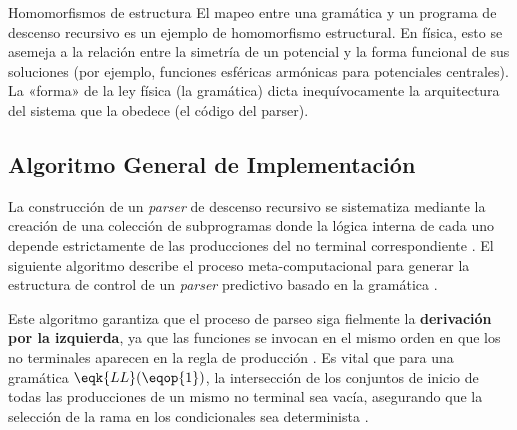 \begin{fisicaconexion}{Homomorfismos de estructura}
El mapeo entre una gramática y un programa de descenso recursivo es un ejemplo de homomorfismo estructural. En física, esto se asemeja a la relación entre la simetría de un potencial y la forma funcional de sus soluciones (por ejemplo, funciones esféricas armónicas para potenciales centrales). La «forma» de la ley física (la gramática) dicta inequívocamente la arquitectura del sistema que la obedece (el código del parser).
\end{fisicaconexion}

\subsection{Algoritmo General de Implementación}
\label{subsec:3_5_3_algoritmo_general}

La construcción de un \textit{parser} de descenso recursivo se sistematiza mediante la creación de una colección de subprogramas donde la lógica interna de cada uno depende estrictamente de las producciones del no terminal correspondiente \cite{aho2006compilers}. El siguiente algoritmo describe el proceso meta-computacional para generar la estructura de control de un \textit{parser} predictivo basado en la gramática .

\begin{algorithm}[H]
\caption{Lógica general de construcción para un parser de descenso recursivo}
\label{alg:rd_general}
\DontPrintSemicolon
{}
\end{algorithm}

Este algoritmo garantiza que el proceso de parseo siga fielmente la \textbf{derivación por la izquierda}, ya que las funciones se invocan en el mismo orden en que los no terminales aparecen en la regla de producción \cite{aho2006compilers}. Es vital que para una gramática $\eqk{LL}(\eqop{1})$, la intersección de los conjuntos de inicio de todas las producciones de un mismo no terminal sea vacía, asegurando que la selección de la rama en los condicionales sea determinista \cite{aho2006compilers,sipser2012introduction}.

